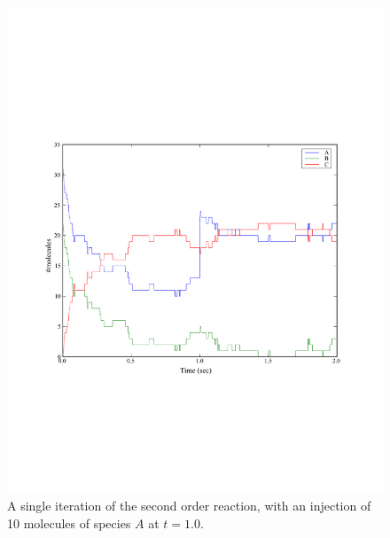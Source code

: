 \documentclass[a4paper,12pt]{book}
\begin{document}
\begin{figure}
\centering
\includegraphics[width=13cm]{secondorderreaction03.pdf}
\caption{A single iteration of the second order reaction, with an injection of 10 molecules of species $A$ at $t=1.0$.}
\label{fig:secondorderreaction03}
\end{figure}
\end{document}
